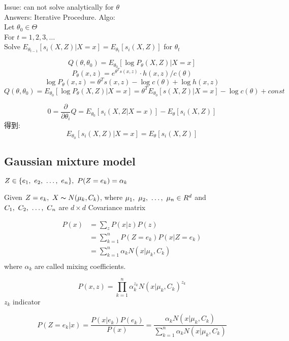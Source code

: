 \documentclass{article}
\begin{document}
\noindent
Issue: can not solve analytically for $\theta$\\
Answers: Iterative Procedure.
Algo: \\
Let $\theta_0 \in \Theta$ \\
For $t = 1,2,3, \ldots$\\
\quad Solve $E_{\theta_{t-1}}[s_i(X,Z)|X=x] = E_{\theta_t}[s_i(X,Z)]$ for $\theta_t$

$$ Q(\theta, \theta_0) = E_{\theta_0}[\log P_\theta(X,Z)|X=x] $$
$$P_\theta(x,z) = e^{\theta^T s(x,z)} \cdot h(x,z) / c(\theta)$$
$$\log P_\theta(x,z) = \theta^T s(x,z) - \log c(\theta) + \log h(x,z)$$
$$ 
Q(\theta, \theta_0) 
= E_{\theta_0}[\log P_\theta(X,Z)|X=x] 
= \theta^T E_{\theta_0}[s(X,Z)|X=x] - \log c(\theta) + const
$$

$$ 0 = \dfrac{\partial }{\partial \theta_i} Q = E_{\theta_0}[s_i(X,Z|X=x)] - E_\theta[s_i(X,Z)] $$
得到:
$$ E_{\theta_0}[s_i(X,Z)|X=x] = E_\theta[s_i(X,Z)] $$

\subsection{Gaussian mixture model}
$Z \in \{e_1,~e_2,~\ldots,~e_n\},\ P(Z = e_k) = \alpha_k$

Given $Z = e_k,\ X \thicksim{N}(\mu_k, C_k)$, where $\mu_1,~\mu_2,~\ldots,~\mu_n \in R^d$ and $C_1,~C_2,~\ldots,~C_n$ are $d \times d$ Covariance matrix

$$
\begin{aligned}
P(x)
& = \sum_z P(x|z)P(z) \\
& = \sum_{k=1}^n P(Z=e_k) P(x|Z = e_k)\\
& = \sum_{k=1}^n \alpha_k N(x|\mu_k,C_k) \\
\end{aligned}
$$
where $\alpha_k$ are called mixing coefficients.

$$
P(x,z) = \prod_{k=1}^n \alpha_k^{z_k} N(x|\mu_k, C_k)^{z_k}
$$
$z_k$ indicator

$$
P(Z=e_k|x) = \dfrac{P(x|e_k) P(e_k)}{P(x)} =  \dfrac{\alpha_k N(x|\mu_k,C_k)}{\sum_{k=1}^n \alpha_k N(x|\mu_k,C_k)}
$$
\end{document}
